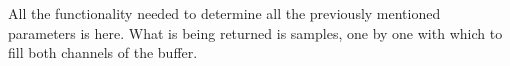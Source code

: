 
All the functionality needed to determine all the previously mentioned
parameters is  here. What is being returned is samples, one by one
with which to fill both channels of the buffer.


%

%
%
%
%


